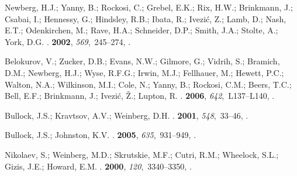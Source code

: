 \begin{thebibliography}{-------}
{Newberg}, H.J.; {Yanny}, B.; {Rockosi}, C.; {Grebel}, E.K.; {Rix}, H.W.;
  {Brinkmann}, J.; {Csabai}, I.; {Hennessy}, G.; {Hindsley}, R.B.; {Ibata}, R.;
  {Ivezi{\'c}}, Z.; {Lamb}, D.; {Nash}, E.T.; {Odenkirchen}, M.; {Rave}, H.A.;
  {Schneider}, D.P.; {Smith}, J.A.; {Stolte}, A.; {York}, D.G.
.
 {\bf 2002}, {\em 569},~245--274,
  \href{http://xxx.lanl.gov/abs/astro-ph/0111095}{{\normalfont
  [astro-ph/0111095]}}.

{Belokurov}, V.; {Zucker}, D.B.; {Evans}, N.W.; {Gilmore}, G.; {Vidrih}, S.;
  {Bramich}, D.M.; {Newberg}, H.J.; {Wyse}, R.F.G.; {Irwin}, M.J.; {Fellhauer},
  M.; {Hewett}, P.C.; {Walton}, N.A.; {Wilkinson}, M.I.; {Cole}, N.; {Yanny},
  B.; {Rockosi}, C.M.; {Beers}, T.C.; {Bell}, E.F.; {Brinkmann}, J.;
  {Ivezi{\'c}}, {\v Z}.; {Lupton}, R.
.
 {\bf 2006}, {\em 642},~L137--L140,
  \href{http://xxx.lanl.gov/abs/astro-ph/0605025}{{\normalfont
  [astro-ph/0605025]}}.

{Bullock}, J.S.; {Kravtsov}, A.V.; {Weinberg}, D.H.
.
 {\bf 2001}, {\em 548},~33--46,
  \href{http://xxx.lanl.gov/abs/astro-ph/0007295}{{\normalfont
  [astro-ph/0007295]}}.

{Bullock}, J.S.; {Johnston}, K.V.
.
 {\bf 2005}, {\em 635},~931--949,
  \href{http://xxx.lanl.gov/abs/astro-ph/0506467}{{\normalfont
  [astro-ph/0506467]}}.

{Nikolaev}, S.; {Weinberg}, M.D.; {Skrutskie}, M.F.; {Cutri}, R.M.; {Wheelock},
  S.L.; {Gizis}, J.E.; {Howard}, E.M.
.
 {\bf 2000}, {\em 120},~3340--3350,
  \href{http://xxx.lanl.gov/abs/astro-ph/0008002}{{\normalfont
  [astro-ph/0008002]}}.


\end{thebibliography}
